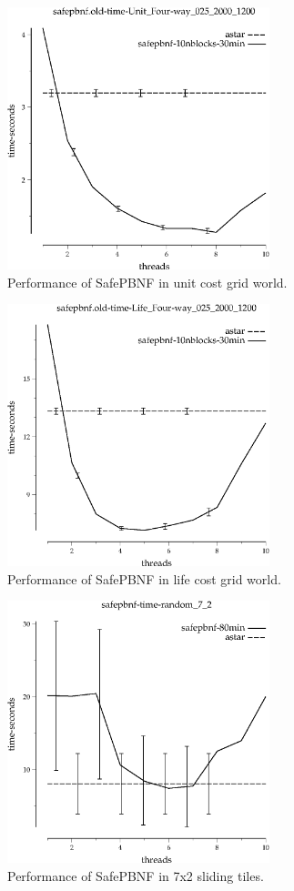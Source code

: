 \documentclass{article}
\begin{document}
\begin{figure}[h!]
\includegraphics[width=3in]{../graphs/seth/grid-unit-single/SAFEPBNF.eps}
\caption{Performance of SafePBNF in unit cost grid world.}
\label{fig:SafePBNF-grid}
\end{figure}

\begin{figure}[h!]
\includegraphics[width=3in]{../graphs/seth/grid-life-single/SAFEPBNF.eps}
\caption{Performance of SafePBNF in life cost grid world.}
\label{fig:SafePBNF-life}
\end{figure}

\begin{figure}[h!]
\includegraphics[width=3in]{../graphs/seth/tiles-single/SAFEPBNF.eps}
\caption{Performance of SafePBNF in 7x2 sliding tiles.}
\label{fig:SafePBNF-life}
\end{figure}
\end{document}
